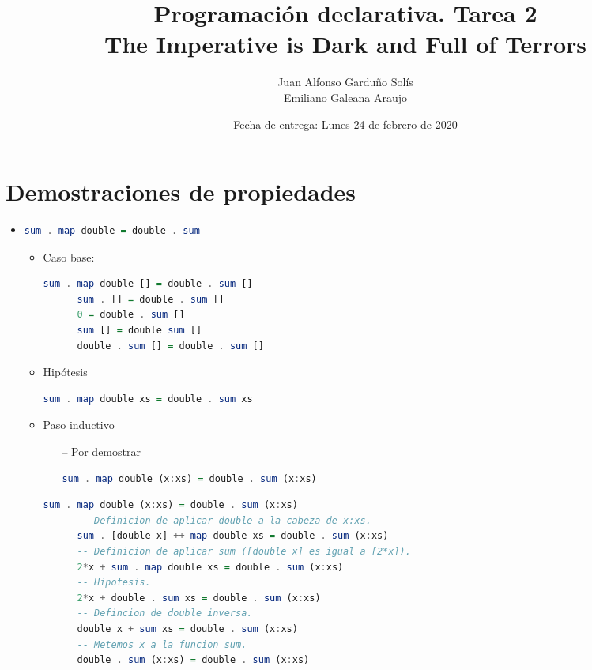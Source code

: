 \documentclass[spanish,12pt,letterpaper]{article}
\title{Programación declarativa. Tarea 2\\
\Huge{The Imperative is Dark and Full of Terrors}}
\author{Juan Alfonso Garduño Solís\\
  Emiliano Galeana Araujo}
\affil{Facultad de ciencias, UNAM}
\date{Fecha de entrega: Lunes 24 de febrero de 2020}
\begin{document}
\maketitle

\section{Demostraciones de propiedades}
\begin{itemize}
\item
  \begin{lstlisting}[language=Haskell]
    sum . map double = double . sum
  \end{lstlisting}
  \begin{itemize}
    \item Caso base:
    \begin{lstlisting}[language=Haskell]
      sum . map double [] = double . sum []
      sum . [] = double . sum []
      0 = double . sum []
      sum [] = double sum []
      double . sum [] = double . sum []
    \end{lstlisting}
  \item Hipótesis
    \begin{lstlisting}[language=Haskell]
      sum . map double xs = double . sum xs
    \end{lstlisting}
  \item Paso inductivo
    \begin{itemize}
    \item [--] Por demostrar
      \begin{lstlisting}[language=Haskell]
        sum . map double (x:xs) = double . sum (x:xs)
      \end{lstlisting}
    \end{itemize}
    \begin{lstlisting}[language=Haskell]
      sum . map double (x:xs) = double . sum (x:xs)
      -- Definicion de aplicar double a la cabeza de x:xs.
      sum . [double x] ++ map double xs = double . sum (x:xs)
      -- Definicion de aplicar sum ([double x] es igual a [2*x]).
      2*x + sum . map double xs = double . sum (x:xs)
      -- Hipotesis.
      2*x + double . sum xs = double . sum (x:xs)
      -- Defincion de double inversa.
      double x + sum xs = double . sum (x:xs)
      -- Metemos x a la funcion sum.
      double . sum (x:xs) = double . sum (x:xs)
    \end{lstlisting}
  \end{itemize}


\end{itemize}
\end{document}
